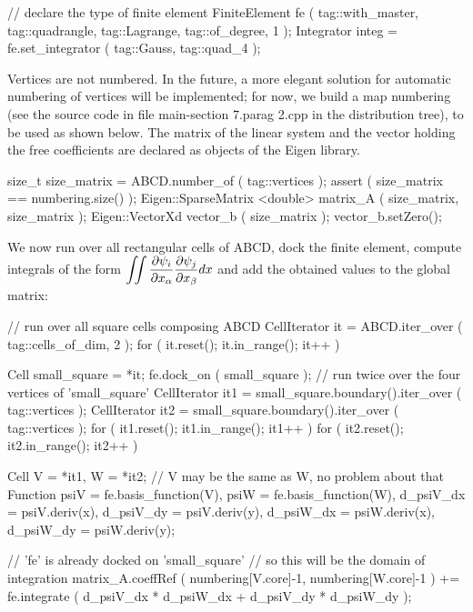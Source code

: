    // declare the type of finite element
   FiniteElement fe
      ( tag::with_master, tag::quadrangle, tag::Lagrange, tag::of_degree, 1 );
   Integrator integ = fe.set_integrator ( tag::Gauss, tag::quad_4 );
\endverbatim

Vertices are not numbered. In the future, a more elegant solution for automatic numbering
of vertices will be implemented; for now, we build a map {\codett numbering} (see the source
code in file {\codett main-\numb section 7.\numb parag 2.cpp} in the distribution tree),
to be used as shown below.
The matrix of the linear system and the vector holding the free coefficients
are declared as objects of the {\codett Eigen} library.

\verbatim
   size_t size_matrix = ABCD.number_of ( tag::vertices );
   assert ( size_matrix == numbering.size() );
   Eigen::SparseMatrix <double> matrix_A ( size_matrix, size_matrix );
   Eigen::VectorXd vector_b ( size_matrix );  vector_b.setZero();
\endverbatim

We now run over all rectangular cells of {\codett ABCD}, dock the finite element,
compute integrals of the form $ \displaystyle \int\!\!\!\int {\partial \psi_i \over
\partial x_\alpha} {\partial \psi_j \over \partial x_\beta} dx $ and add the obtained
values to the global matrix:

\verbatim
   // run over all square cells composing ABCD
   CellIterator it = ABCD.iter_over ( tag::cells_of_dim, 2 );
   for ( it.reset(); it.in_range(); it++ )
   {  Cell small_square = *it;
      fe.dock_on ( small_square );
      // run twice over the four vertices of 'small_square'
      CellIterator it1 = small_square.boundary().iter_over ( tag::vertices );
      CellIterator it2 = small_square.boundary().iter_over ( tag::vertices );
      for ( it1.reset(); it1.in_range(); it1++ )
      for ( it2.reset(); it2.in_range(); it2++ )
      {  Cell V = *it1, W = *it2;
         // V may be the same as W, no problem about that
         Function psiV = fe.basis_function(V),
                  psiW = fe.basis_function(W),
                  d_psiV_dx = psiV.deriv(x),
                  d_psiV_dy = psiV.deriv(y),
                  d_psiW_dx = psiW.deriv(x),
                  d_psiW_dy = psiW.deriv(y);
\endverbatim

\vfil\eject
\verbatim
         // 'fe' is already docked on 'small_square'
         // so this will be the domain of integration
         matrix_A.coeffRef ( numbering[V.core]-1, numbering[W.core]-1 ) +=
            fe.integrate ( d_psiV_dx * d_psiW_dx + d_psiV_dy * d_psiW_dy );      }  }
\endverbatim

